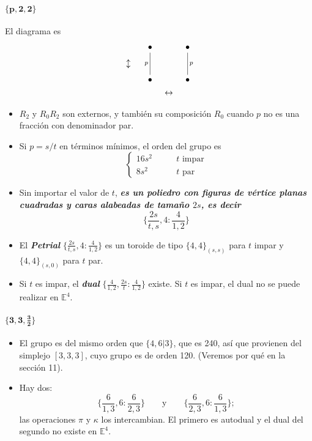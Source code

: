 \documentclass[spanish]{article}
\theoremstyle{definition}
\begin{document}
\paragraph{$\mathbf{\{p,2,2\}}$}
El diagrama es
\[\begin{tikzcd}[row sep=tiny,column sep=tiny]
	&&\bullet\arrow[dd,no head,"p",swap]&&\bullet\arrow[dd,no head,"p"]\\
	\updownarrow&&&&\\
	&&\bullet&&\bullet\\
	&&&\leftrightarrow
\end{tikzcd}\]
\begin{itemize}
	\item $R_2$ y $R_0R_2$ son externos, y también su composición $R_0$ cuando $p$ no es una fracción con denominador par.
	\item Si $p=s/t$ en términos mínimos, el orden del grupo es
	\[\begin{cases}
		16s^2\qquad&t\text{ impar}\\
		8s^2\qquad&t\text{ par}
	\end{cases}\]
	\item Sin importar el valor de $t$, \textbf{\textit{es un poliedro con figuras de vértice planas cuadradas y caras alabeadas de tamaño $2s$, es decir}}
	\[\{\frac{2s}{t,s},4:\frac{4}{1,2}\}\]
	\item El \textbf{\textit{Petrial}} $\{\frac{2s}{t,s},4:\frac{4}{1,2}\}$ es un toroide de tipo $\{4,4\}_{(s,s)}$ para $t$ impar y $\{4,4\}_{(s,0)}$ para $t$ par.
	\item Si $t$ es impar, el \textbf{\textit{dual}} $\{\frac{4}{1,2},\frac{2s}{t}:\frac{4}{1,2}\}$ existe. Si $t$ es impar, el dual no se puede realizar en $\mathbb{E}^4$.
\end{itemize}

\paragraph{$\mathbf{\{3,3,\frac{3}{2}\}}$}
\begin{itemize}
	\item El grupo es del mismo orden que $\{4,6|3\}$, que es 240, así que provienen del simplejo $[3,3,3]$, cuyo grupo es de orden 120. (Veremos por qué en la sección 11).
	\item Hay dos:
		\[\{\frac{6}{1,3},6:\frac{6}{2,3}\}\qquad\text{y}\qquad\{\frac{6}{2,3},6:\frac{6}{1,3}\};\]
	 las operaciones $\pi$ y $\kappa$ los intercambian. El primero es autodual y el dual del segundo no existe en $\mathbb{E}^4$.
\end{itemize}
\end{document}
